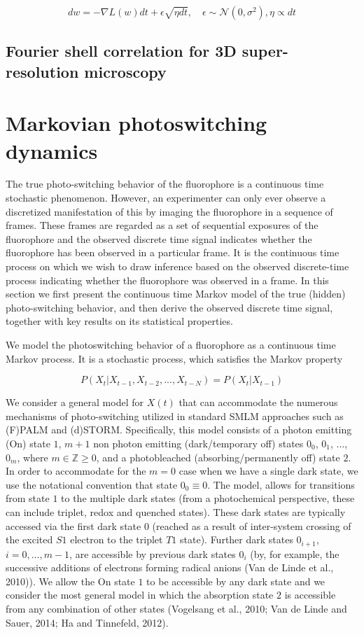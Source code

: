 \documentclass{ucetd}
\begin{document}
$$dw = - \nabla L(w) dt + \epsilon \sqrt{\eta dt}, \quad \epsilon \sim \mathcal N(0, \sigma^2), \eta \propto dt$$

\subsection{Fourier shell correlation for 3D super-resolution microscopy}

\section{Markovian photoswitching dynamics}

The true photo-switching behavior of the fluorophore is a continuous time stochastic phenomenon. However, an experimenter can only ever observe a discretized manifestation of this
by imaging the fluorophore in a sequence of frames. These frames are regarded as a set of
sequential exposures of the fluorophore and the observed discrete time signal indicates whether
the fluorophore has been observed in a particular frame. It is the continuous time process on
which we wish to draw inference based on the observed discrete-time process indicating whether
the fluorophore was observed in a frame. In this section we first present the continuous time
Markov model of the true (hidden) photo-switching behavior, and then derive the observed
discrete time signal, together with key results on its statistical properties.


We model the photoswitching behavior of a fluorophore as a continuous time Markov process. It is a stochastic process, which satisfies the Markov property

\begin{equation*}
P(X_{t}|X_{t-1}, X_{t-2}, ..., X_{t-N}) = P(X_{t}|X_{t-1})
\end{equation*}

We consider a general model for $X(t)$ that can accommodate the numerous mechanisms of photo-switching utilized in standard SMLM approaches such as (F)PALM and (d)STORM. Specifically, this model consists of a photon emitting (On) state $1$, $m+1$ non photon emitting (dark/temporary off) states $0_0$, $0_1$, $\ldots$, $0_m$, where $m \in \mathbb{Z}{\geq 0}$, and a photobleached (absorbing/permanently off) state $2$. In order to accommodate for the $m = 0$ case when we have a single dark state, we use the notational convention that state $0_0 \equiv 0$. The model, allows for transitions from state $1$ to the multiple dark states (from a photochemical perspective, these can include triplet, redox and quenched states). These dark states are typically accessed via the first dark state $0$ (reached as a result of inter-system crossing of the excited $S1$ electron to the triplet $T1$ state). Further dark states $0_{i+1}$, $i = 0, \ldots, m-1$, are accessible by previous dark states $0_i$ (by, for example, the successive additions of electrons forming radical anions (Van de Linde et al., 2010)). We allow the On state $1$ to be accessible by any dark state and we consider the most general model in which the absorption state $2$ is accessible from any combination of other states (Vogelsang et al., 2010; Van de Linde and Sauer, 2014; Ha and Tinnefeld, 2012).
\end{document}
